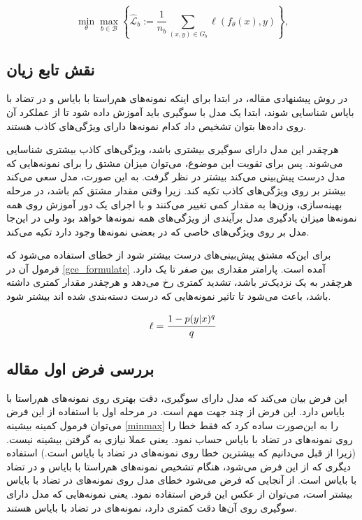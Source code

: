 \begin{equation}
	\min_{\theta} \max_{b \in \mathcal{B}} 
	\left\{
	\hat{\mathcal{L}}_b := \frac{1}{n_b} 
	\sum_{(x,y) \in G_b} \ell(f_\theta(x),y)
	\right\},
	\label{minmax}
\end{equation}

\subsection{نقش تابع زیان }
در روش پیشنهادی مقاله، در ابتدا برای اینکه نمونه‌های هم‌راستا با بایاس و در تضاد با بایاس شناسایی شوند، ابتدا یک مدل با سوگیری باید آموزش داده شود تا از عملکرد آن روی داده‌ها بتوان تشخیص داد کدام نمونه‌ها دارای ویژگی‌های کاذب هستند. 

هرچقدر این مدل دارای سوگیری بیشتری باشد، ویژگی‌های کاذب بیشتری شناسایی می‌شوند. پس برای تقویت این موضوع، می‌توان میزان مشتق را برای نمونه‌هایی که مدل درست پیش‌بینی می‌کند بیشتر در نظر گرفت. به این صورت، مدل سعی می‌کند بیشتر بر روی ویژگی‌های کاذب  تکیه کند. زیرا وقتی مقدار مشتق کم باشد، در مرحله بهینه‌سازی، وزن‌ها به مقدار کمی تغییر می‌کنند و با اجرای یک دور آموزش روی همه نمونه‌ها میزان یادگیری مدل برآیندی از ویژگی‌های همه نمونه‌ها خواهد بود ولی در این‌جا مدل بر روی ویژگی‌های خاصی که در بعضی نمونه‌ها وجود دارد تکیه می‌کند. 

برای این‌که مشتق پیش‌بینی‌های درست بیشتر شود از خطای 
استفاده می‌شود که فرمول آن در 
\eqref{gce_formulate}
آمده است. پارامتر 
مقداری بین صفر تا یک دارد. هرچقدر به یک نزدیک‌تر باشد، تشدید کمتری رخ می‌دهد و هرچقدر مقدار کمتری داشته باشد، باعث می‌شود تا تاثیر نمونه‌هایی که درست دسته‌بندی شده اند بیشتر شود.

\begin{equation}
	\label{gce_formulate}
	\ell = \cfrac{1 - p(y | x)^q}{q}
\end{equation}

\subsection{بررسی فرض اول مقاله}
این فرض بیان می‌کند که مدل دارای سوگیری، دقت بهتری روی نمونه‌های هم‌راستا با بایاس دارد. این فرض از چند جهت مهم است. در مرحله اول با استفاده از این فرض می‌توان فرمول کمینه بیشینه 
\eqref{minmax}
را به این‌صورت ساده کرد که فقط خطا را روی نمونه‌های در تضاد با بایاس حساب نمود. یعنی عملا نیازی به گرفتن بیشینه نیست. (زیرا از قبل می‌دانیم که بیشترین خطا روی نمونه‌های در تضاد با بایاس است.) استفاده دیگری که از این فرض می‌شود، هنگام تشخیص نمونه‌های هم‌راستا با بایاس و در تضاد با بایاس است. از آنجایی که فرض می‌شود خطای مدل روی نمونه‌های در تضاد با بایاس بیشتر است، می‌توان از عکس این فرض استفاده نمود. یعنی نمونه‌هایی که مدل دارای سوگیری روی آن‌ها دقت کمتری دارد، نمونه‌های در تضاد با بایاس هستند.
